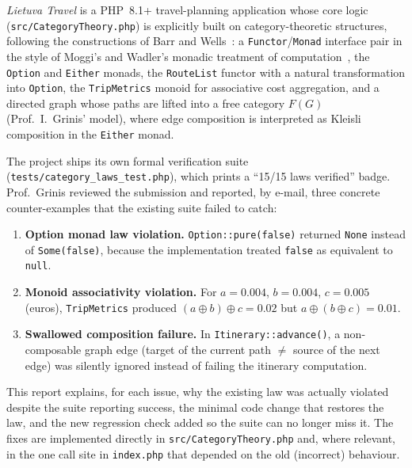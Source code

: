 \emph{Lietuva Travel} is a PHP~8.1+ travel-planning application whose core logic (\texttt{src/CategoryTheory.php}) is explicitly built on category-theoretic structures, following the constructions of Barr and Wells~\cite{BarrWells1990}: a \texttt{Functor}/\texttt{Monad} interface pair in the style of Moggi's and Wadler's monadic treatment of computation~\cite{Moggi1991,Wadler1992}, the \texttt{Option} and \texttt{Either} monads, the \texttt{RouteList} functor with a natural transformation into \texttt{Option}, the \texttt{TripMetrics} monoid for associative cost aggregation, and a directed graph whose paths are lifted into a free category $F(G)$ (Prof.~I.~Grinis' model), where edge composition is interpreted as Kleisli composition in the \texttt{Either} monad.

The project ships its own formal verification suite (\texttt{tests/category\_laws\_test.php}), which prints a ``15/15 laws verified'' badge. Prof.~Grinis reviewed the submission and reported, by e-mail, three concrete counter-examples that the existing suite failed to catch:

\begin{enumerate}
  \item \textbf{Option monad law violation.} \texttt{Option::pure(false)} returned \texttt{None} instead of \texttt{Some(false)}, because the implementation treated \texttt{false} as equivalent to \texttt{null}.
  \item \textbf{Monoid associativity violation.} For $a=0.004$, $b=0.004$, $c=0.005$ (euros), \texttt{TripMetrics} produced $(a\oplus b)\oplus c = 0.02$ but $a\oplus(b\oplus c)=0.01$.
  \item \textbf{Swallowed composition failure.} In \texttt{Itinerary::advance()}, a non-composable graph edge (target of the current path $\neq$ source of the next edge) was silently ignored instead of failing the itinerary computation.
\end{enumerate}

This report explains, for each issue, why the existing law was actually violated despite the suite reporting success, the minimal code change that restores the law, and the new regression check added so the suite can no longer miss it. The fixes are implemented directly in \texttt{src/CategoryTheory.php} and, where relevant, in the one call site in \texttt{index.php} that depended on the old (incorrect) behaviour.
